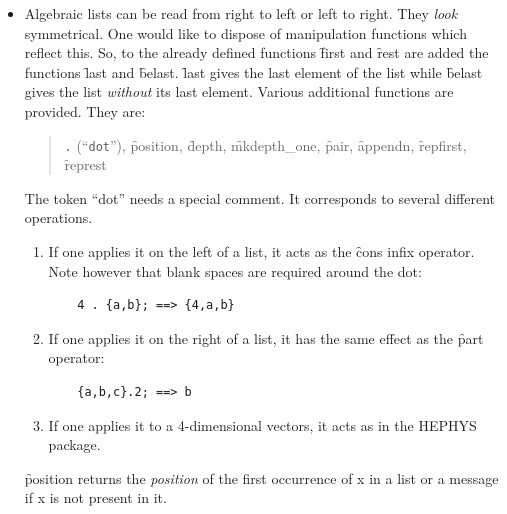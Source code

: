 \begin{itemize}
\begin{verbatim}
    merge_list(ll,ll,lessp); ==> {1,1,2,2,3,3}
\end{verbatim}
Notice that \f{merge\_list} will act correctly only if the two lists
are well ordered themselves.
\item[vi.]
Algebraic lists can be read from right to left or left to right.
They \emph{look} symmetrical. One would like to dispose of manipulation
functions which reflect this.
%
%
%
%
\hypertarget{operator:LAST}{}%
\hypertarget{operator:BELAST}{}%
So, to the already defined functions  \f{first} and \f{rest} are
added the functions \f{last}  and \f{belast}. \f{last} gives the last
element of the list while \f{belast} gives the list \emph{without} its
last element.
Various additional functions are provided. They are:
\hypertarget{operator:POSITION}{}
\hypertarget{operator:DEPTH}{}
\hypertarget{operator:MKDEPTH_ONE}{}
\hypertarget{operator:PAIR}{}
\hypertarget{operator:APPENDN}{}
\hypertarget{operator:REPFIRST}{}
\hypertarget{operator:REPREST}{}
\begin{quote}\sloppy\raggedright
\texttt{.} (``\texttt{dot}''), \f{position}, \f{depth}, \f{mkdepth\_one},
\f{pair}, \f{appendn}, \f{repfirst}, \f{represt}
\end{quote}
The token ``dot'' needs a special comment. It corresponds to
several different operations.
\begin{enumerate}
\item If one applies it on the left of a list, it acts as the \f{cons}
infix operator. Note however that blank spaces are required around the dot:
\begin{verbatim}
    4 . {a,b}; ==> {4,a,b}
\end{verbatim}
\item If one applies it on the right of a list, it has the same
effect as the \f{part} operator:
\begin{verbatim}
    {a,b,c}.2; ==> b
\end{verbatim}
\item If one applies it to  a 4-dimensional vectors, it acts as in the
HEPHYS package.
\end{enumerate}
\f{position} returns the \emph{position} of the first occurrence of x in
a list or a message if x is not present in it.


\end{itemize}
